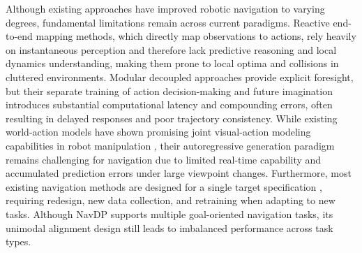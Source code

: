 \documentclass{article}
\begin{document}
Although existing approaches have improved robotic navigation to varying degrees, fundamental limitations remain across current paradigms. Reactive end-to-end mapping methods, which directly map observations to actions, rely heavily on instantaneous perception and therefore lack predictive reasoning and local dynamics understanding, making them prone to local optima and collisions in cluttered environments. Modular decoupled approaches provide explicit foresight, but their separate training of action decision-making and future imagination introduces substantial computational latency and compounding errors, often resulting in delayed responses and poor trajectory consistency. While existing world-action models have shown promising joint visual-action modeling capabilities in robot manipulation \citep{ye2026dreamzero, bi2025motus, antgroup2026lingbotva}, their autoregressive generation paradigm remains challenging for navigation due to limited real-time capability and accumulated prediction errors under large viewpoint changes. Furthermore, most existing navigation methods are designed for a single target specification \citep{shah2023gnm,shah2023vint,sridhar2024nomad,peng2025logoplanner,bar2025nwm,qin2025navigatediff,dong2025uniwm}, requiring redesign, new data collection, and retraining when adapting to new tasks. Although NavDP \citep{cai2025navdp} supports multiple goal-oriented navigation tasks, its unimodal alignment design still leads to imbalanced performance across task types.

\end{document}

